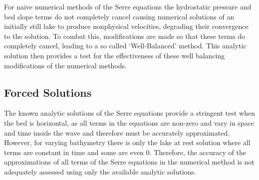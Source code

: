 For naive numerical methods of the Serre equations the hydrostatic pressure and bed slope terms do not completely cancel causing numerical solutions of an initially still lake to produce nonphysical velocities, degrading their convergence to the solution. To combat this, modifications are made so that these terms do completely cancel, leading to a so called `Well-Balanced' method. This analytic solution then provides a test for the effectiveness of these well balancing modifications of the numerical methods.


\subsection{Forced Solutions}
The known analytic solutions of the Serre equations provide a stringent test when the bed is horizontal, as all terms in the equations are non-zero and vary in space and time inside the wave and therefore must be accurately approximated. However, for varying bathymetry there is only the lake at rest solution where all terms are constant in time and some are even $0$. Therefore, the accuracy of the approximations of all terms of the Serre equations in the numerical method is not adequately assessed using only the available analytic solutions.

